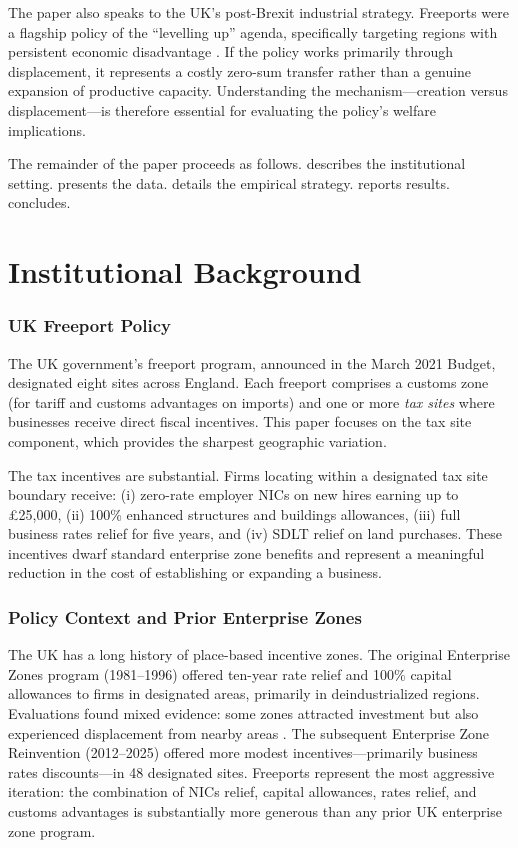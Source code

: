 \documentclass[12pt]{article}
\begin{document}
The paper also speaks to the UK's post-Brexit industrial strategy. Freeports were a flagship policy of the ``levelling up'' agenda, specifically targeting regions with persistent economic disadvantage \citep{sunak2019free}. If the policy works primarily through displacement, it represents a costly zero-sum transfer rather than a genuine expansion of productive capacity. Understanding the mechanism---creation versus displacement---is therefore essential for evaluating the policy's welfare implications.

The remainder of the paper proceeds as follows.  describes the institutional setting.  presents the data.  details the empirical strategy.  reports results.  concludes.


\section{Institutional Background}\label{sec:background}

\subsubsection*{UK Freeport Policy} The UK government's freeport program, announced in the March 2021 Budget, designated eight sites across England. Each freeport comprises a customs zone (for tariff and customs advantages on imports) and one or more \textit{tax sites} where businesses receive direct fiscal incentives. This paper focuses on the tax site component, which provides the sharpest geographic variation.

The tax incentives are substantial. Firms locating within a designated tax site boundary receive: (i) zero-rate employer NICs on new hires earning up to \pounds25,000, (ii) 100\% enhanced structures and buildings allowances, (iii) full business rates relief for five years, and (iv) SDLT relief on land purchases. These incentives dwarf standard enterprise zone benefits and represent a meaningful reduction in the cost of establishing or expanding a business.

\subsubsection*{Policy Context and Prior Enterprise Zones} The UK has a long history of place-based incentive zones. The original Enterprise Zones program (1981--1996) offered ten-year rate relief and 100\% capital allowances to firms in designated areas, primarily in deindustrialized regions. Evaluations found mixed evidence: some zones attracted investment but also experienced displacement from nearby areas \citep{neumark2015enterprise}. The subsequent Enterprise Zone Reinvention (2012--2025) offered more modest incentives---primarily business rates discounts---in 48 designated sites. Freeports represent the most aggressive iteration: the combination of NICs relief, capital allowances, rates relief, and customs advantages is substantially more generous than any prior UK enterprise zone program.
\end{document}
